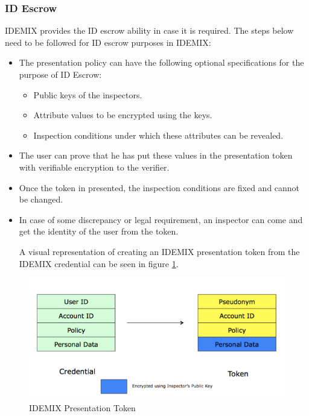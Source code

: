 \subsubsection{ID Escrow}
IDEMIX provides the ID escrow ability in case it is required. The steps below need to be followed for ID escrow purposes in IDEMIX:
\begin{itemize}
	\item The presentation policy can have the following optional specifications for the purpose of ID Escrow:
	\begin{itemize}
		\item Public keys of the inspectors.
		\item Attribute values to be encrypted using the keys.
		\item Inspection conditions under which these attributes can be revealed.
	\end{itemize}
	\item The user can prove that he has put these values in the presentation token with verifiable encryption\cite{camenisch2003practical} to the verifier.
	\item Once the token in presented, the inspection conditions are fixed and cannot be changed. 
	\item In case of some discrepancy or legal requirement, an inspector can come and get the identity of the user from the token.
	
	A visual representation of creating an IDEMIX presentation token from the IDEMIX credential can be seen in figure \ref{fig:Token}.
\end{itemize}
\begin{figure}[h]
	\centering
	\includegraphics[width=\textwidth]{figures/Token}
	\caption{IDEMIX Presentation Token}
	\label{fig:Token}
\end{figure}

